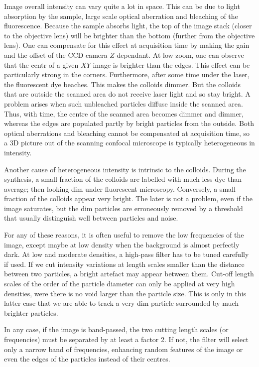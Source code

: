 Image overall intensity can vary quite a lot in space. This can be due to light absorption by the sample, large scale optical aberration and bleaching of the fluorescence. Because the sample absorbs light, the top of the image stack (closer to the objective lens) will be brighter than the bottom (further from the objective lens). One can compensate for this effect at acquisition time by making the gain and the offset of the \ac{CCD} camera $Z$-dependant. At low zoom, one can observe that the centr of a given $XY$ image is brighter than the edges. This effect can be particularly strong in the corners. Furthermore, after some time under the laser, the fluorescent dye beaches. This makes the colloids dimmer. But the colloids that are outside the scanned area do not receive laser light and so stay bright. A problem arises when such unbleached particles diffuse inside the scanned area. Thus, with time, the centre of the scanned area becomes dimmer and dimmer, whereas the edges are populated partly by bright particles from the outside. Both optical aberrations and bleaching cannot be compensated at acquisition time, so a 3D picture out of the scanning confocal microscope is typically heterogeneous in intensity.

Another cause of heterogeneous intensity is intrinsic to the colloids. During the synthesis, a small fraction of the colloids are labelled with much less dye than average; then looking dim under fluorescent microscopy. Conversely, a small fraction of the colloids appear very bright. The later is not a problem, even if the image saturates, but the dim particles are erroneously removed by a threshold that usually distinguish well between particles and noise.

For any of these reasons, it is often useful to remove the low frequencies of the image, except maybe at low density when the background is almost perfectly dark. At low and moderate densities, a high-pass filter has to be tuned carefully if used. If we cut intensity variations at length scales smaller than the distance between two particles, a bright artefact may appear between them. Cut-off length scales of the order of the particle diameter can only be applied at very high densities, were there is no void larger than the particle size. This is only in this latter case that we are able to track a very dim particle surrounded by much brighter particles.

In any case, if the image is band-passed, the two cutting length scales (or frequencies) must be separated by at least a factor 2. If not, the filter will select only a narrow band of frequencies, enhancing random features of the image or even the edges of the particles instead of their centres.

